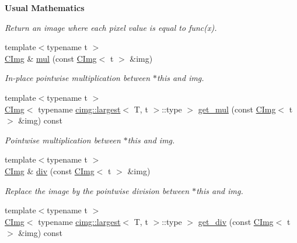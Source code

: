 \begin{Indent}{\bf Usual Mathematics}
\begin{DoxyCompactItemize}
\begin{DoxyCompactList}\small\item\em Return an image where each pixel value is equal to func(x). \item\end{DoxyCompactList}\item 
{\footnotesize template$<$typename t $>$ }\\\hyperlink{structcimg__library_1_1_c_img}{CImg} \& \hyperlink{structcimg__library_1_1_c_img_ab48fffcb6d99d69f36246f87e3f163ea}{mul} (const \hyperlink{structcimg__library_1_1_c_img}{CImg}$<$ t $>$ \&img)
\begin{DoxyCompactList}\small\item\em In-\/place pointwise multiplication between {\ttfamily $\ast$this} and {\ttfamily img}. \item\end{DoxyCompactList}\item 
{\footnotesize template$<$typename t $>$ }\\\hyperlink{structcimg__library_1_1_c_img}{CImg}$<$ typename \hyperlink{structcimg__library_1_1cimg_1_1largest}{cimg::largest}$<$ T, t $>$::type $>$ \hyperlink{structcimg__library_1_1_c_img_a7fdedeb6e1f6a0ae86336ac371a09a7c}{get\_\-mul} (const \hyperlink{structcimg__library_1_1_c_img}{CImg}$<$ t $>$ \&img) const 
\begin{DoxyCompactList}\small\item\em Pointwise multiplication between {\ttfamily $\ast$this} and {\ttfamily img}. \item\end{DoxyCompactList}\item 
{\footnotesize template$<$typename t $>$ }\\\hyperlink{structcimg__library_1_1_c_img}{CImg} \& \hyperlink{structcimg__library_1_1_c_img_a1e4805fd1add88e96a5acd42d3fcc2e9}{div} (const \hyperlink{structcimg__library_1_1_c_img}{CImg}$<$ t $>$ \&img)
\begin{DoxyCompactList}\small\item\em Replace the image by the pointwise division between {\ttfamily $\ast$this} and {\ttfamily img}. \item\end{DoxyCompactList}\item 
{\footnotesize template$<$typename t $>$ }\\\hyperlink{structcimg__library_1_1_c_img}{CImg}$<$ typename \hyperlink{structcimg__library_1_1cimg_1_1largest}{cimg::largest}$<$ T, t $>$::type $>$ \hyperlink{structcimg__library_1_1_c_img_a1b20ed28e7cbbea39f0048a0960257c1}{get\_\-div} (const \hyperlink{structcimg__library_1_1_c_img}{CImg}$<$ t $>$ \&img) const 

\end{DoxyCompactItemize}
\end{Indent}
